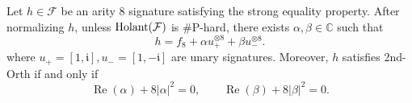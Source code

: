 \begin{lemma}
\label{lm: f8 normalized equations}
Let $h\in \mathcal{F}$ be an arity 8 signature satisfying the strong equality property. 
After normalizing $h$,
unless $\operatorname{Holant}(\mathcal{F})$ is \#P-hard,
there exists
$\alpha,\beta\in\mathbb C$ such that
\begin{equation}
 h= f_8+\alpha u_+^{\otimes8}+\beta u_-^{\otimes8}.
 \label{eq: f8 kernel family}
\end{equation}
where $u_+=[1, \mathfrak i], u_-=[1, -\mathfrak i]$ are unary signatures.
Moreover, $h$ satisfies {\sc 2nd-Orth} if and only if
\begin{equation}
 \operatorname{Re}(\alpha)+8|\alpha|^2=0,
 \qquad
 \operatorname{Re}(\beta)+8|\beta|^2=0.
 \label{eq: f8 second orth circles}
\end{equation}
\end{lemma}

